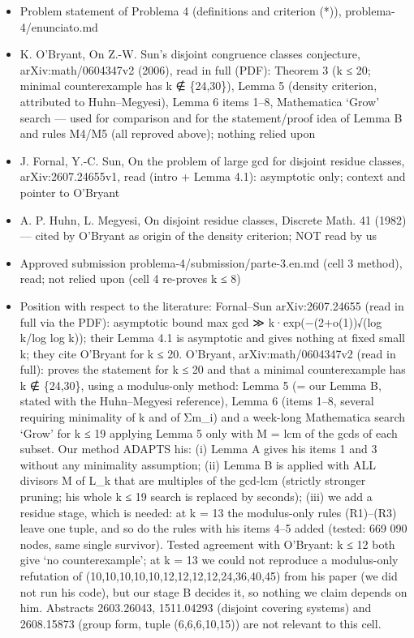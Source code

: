 \begin{itemize}
\tightlist
\item
  Problem statement of Problema 4 (definitions and criterion (*)),
  problema-4/enunciato.md
\item
  K. O'Bryant, On Z.-W. Sun's disjoint congruence classes conjecture,
  arXiv:math/0604347v2 (2006), read in full (PDF): Theorem 3 (k ≤ 20;
  minimal counterexample has k ∉ \{24,30\}), Lemma 5 (density criterion,
  attributed to Huhn--Megyesi), Lemma 6 items 1--8, Mathematica `Grow'
  search --- used for comparison and for the statement/proof idea of
  Lemma B and rules M4/M5 (all reproved above); nothing relied upon
\item
  J. Fornal, Y.-C. Sun, On the problem of large gcd for disjoint residue
  classes, arXiv:2607.24655v1, read (intro + Lemma 4.1): asymptotic
  only; context and pointer to O'Bryant
\item
  A. P. Huhn, L. Megyesi, On disjoint residue classes, Discrete Math. 41
  (1982) --- cited by O'Bryant as origin of the density criterion; NOT
  read by us
\item
  Approved submission problema-4/submission/parte-3.en.md (cell 3
  method), read; not relied upon (cell 4 re-proves k ≤ 8)
\item
  Position with respect to the literature: Fornal--Sun arXiv:2607.24655
  (read in full via the PDF): asymptotic bound max gcd ≫
  k·exp(−(2+o(1))√(log k/log log k)); their Lemma 4.1 is asymptotic and
  gives nothing at fixed small k; they cite O'Bryant for k ≤ 20.
  O'Bryant, arXiv:math/0604347v2 (read in full): proves the statement
  for k ≤ 20 and that a minimal counterexample has k ∉ \{24,30\}, using
  a modulus-only method: Lemma 5 (= our Lemma B, stated with the
  Huhn--Megyesi reference), Lemma 6 (items 1--8, several requiring
  minimality of k and of Σm\_i) and a week-long Mathematica search
  `Grow' for k ≤ 19 applying Lemma 5 only with M = lcm of the gcds of
  each subset. Our method ADAPTS his: (i) Lemma A gives his items 1 and
  3 without any minimality assumption; (ii) Lemma B is applied with ALL
  divisors M of L\_k that are multiples of the gcd-lcm (strictly
  stronger pruning; his whole k ≤ 19 search is replaced by seconds);
  (iii) we add a residue stage, which is needed: at k = 13 the
  modulus-only rules (R1)--(R3) leave one tuple, and so do the rules
  with his items 4--5 added (tested: 669 090 nodes, same single
  survivor). Tested agreement with O'Bryant: k ≤ 12 both give `no
  counterexample'; at k = 13 we could not reproduce a modulus-only
  refutation of (10,10,10,10,10,12,12,12,12,24,36,40,45) from his paper
  (we did not run his code), but our stage B decides it, so nothing we
  claim depends on him. Abstracts 2603.26043, 1511.04293 (disjoint
  covering systems) and 2608.15873 (group form, tuple (6,6,6,10,15)) are
  not relevant to this cell.
\end{itemize}


